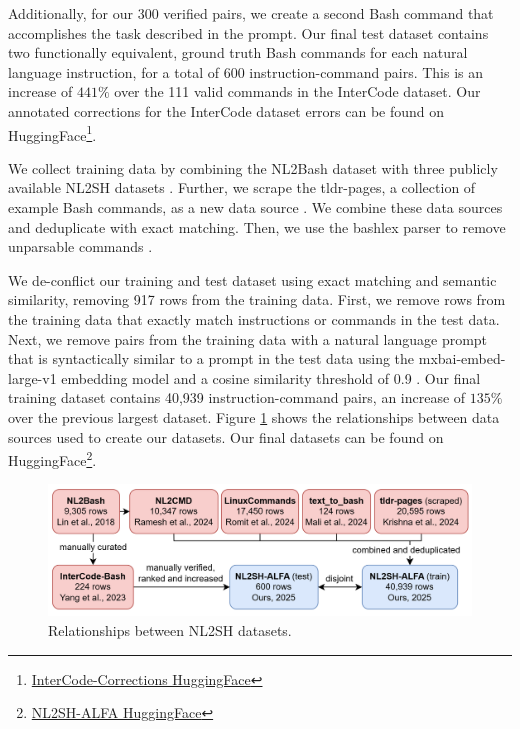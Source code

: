 \documentclass[11pt]{article}
\begin{document}
Additionally, for our 300 verified pairs, we create a second Bash command that accomplishes the task described in the prompt. Our final test dataset contains two functionally equivalent, ground truth Bash commands for each natural language instruction, for a total of 600 instruction-command pairs. This is an increase of $441\%$ over the 111 valid commands in the InterCode dataset. Our annotated corrections for the InterCode dataset errors can be found on HuggingFace\footnote{\href{https://huggingface.co/datasets/westenfelder/InterCode-Corrections}{InterCode-Corrections HuggingFace}}.

We collect training data by combining the NL2Bash dataset with three publicly available NL2SH datasets \cite{dataset2, dataset3, dataset4}. Further, we scrape the tldr-pages, a collection of example Bash commands, as a new data source \cite{tldr}. We combine these data sources and deduplicate with exact matching. Then, we use the bashlex parser to remove unparsable commands \cite{bashlex}.

We de-conflict our training and test dataset using exact matching and semantic similarity, removing 917 rows from the training data. First, we remove rows from the training data that exactly match instructions or commands in the test data. Next, we remove pairs from the training data with a natural language prompt that is syntactically similar to a prompt in the test data using the mxbai-embed-large-v1 embedding model and a cosine similarity threshold of 0.9 \cite{mxbai}. Our final training dataset contains 40,939 instruction-command pairs, an increase of $135\%$ over the previous largest dataset. Figure \ref{fig:datasets} shows the relationships between data sources used to create our datasets. Our final datasets can be found on HuggingFace\footnote{\href{https://huggingface.co/datasets/westenfelder/NL2SH-ALFA}{NL2SH-ALFA HuggingFace}}.

\begin{figure}[ht!]
  \centering
  \includegraphics[width=0.99\columnwidth]{figs/datasets.png}
  \caption{Relationships between NL2SH datasets.}
  \label{fig:datasets}
\end{figure}
\end{document}
